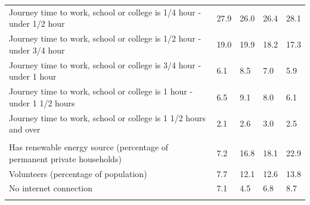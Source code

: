 \documentclass{article}
\begin{document}
\begin{table}[h]
\begin{tabular}{KTTTT}
Journey time to work, school or college is 1/4 hour - under 1/2 hour & 27.9& 26.0& 26.4& 28.1\\
Journey time to work, school or college is 1/2 hour - under 3/4 hour & 19.0& 19.9& 18.2& 17.3\\
Journey time to work, school or college is 3/4 hour - under 1 hour & 6.1& 8.5& 7.0& 5.9\\
Journey time to work, school or college is 1 hour - under 1 1/2 hours & 6.5& 9.1& 8.0& 6.1\\
Journey time to work, school or college is 1 1/2 hours and over & 2.1& 2.6& 3.0& 2.5\\
\hline
    \\ 
    \hline
Has renewable energy source (percentage of permanent private households) &  7.2& 16.8& 18.1& 22.9\\
    \hline
Volunteers (percentage of population) &  7.7& 12.1& 12.6& 13.8\\
    \hline
No internet connection& 7.1& 4.5& 6.8& 8.7\\
\hline
\end{tabular}
\end{table}
\end{document}

